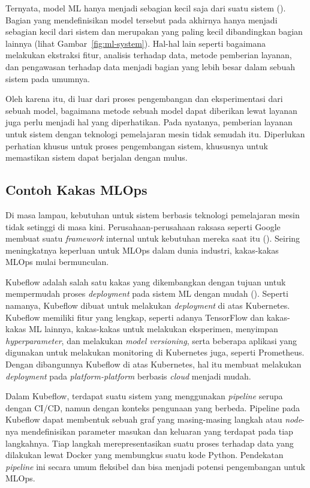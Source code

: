 Ternyata, model ML hanya menjadi sebagian kecil saja dari suatu sistem (\cite{NIPS2015_86df7dcf}).
Bagian yang mendefinisikan model tersebut pada akhirnya hanya menjadi sebagian kecil dari sistem dan merupakan yang paling kecil dibandingkan bagian lainnya (lihat Gambar~\ref{fig:ml-system}).
Hal-hal lain seperti bagaimana melakukan ekstraksi fitur, analisis terhadap data, metode pemberian layanan, dan pengawasan terhadap data menjadi bagian yang lebih besar dalam sebuah sistem pada umumnya.

Oleh karena itu, di luar dari proses pengembangan dan eksperimentasi dari sebuah model, bagaimana metode sebuah model dapat diberikan lewat layanan juga perlu menjadi hal yang diperhatikan.
Pada nyatanya, pemberian layanan untuk sistem dengan teknologi pemelajaran mesin tidak semudah itu.
Diperlukan perhatian khusus untuk proses pengembangan sistem, khususnya untuk memastikan sistem dapat berjalan dengan mulus.

\subsection{Contoh Kakas MLOps}

Di masa lampau, kebutuhan untuk sistem berbasis teknologi pemelajaran mesin tidak setinggi di masa kini. 
Perusahaan-perusahaan raksasa seperti Google membuat suatu \textit{framework} internal untuk kebutuhan mereka saat itu (\cite{mlops}).
Seiring meningkatnya keperluan untuk MLOps dalam dunia industri, kakas-kakas MLOps mulai bermunculan.

Kubeflow adalah salah satu kakas yang dikembangkan dengan tujuan untuk mempermudah proses \textit{deployment} pada sistem ML dengan mudah (\cite{k8s}).
Seperti namanya, Kubeflow dibuat untuk melakukan \textit{deployment} di atas Kubernetes.
Kubeflow memiliki fitur yang lengkap, seperti adanya TensorFlow dan kakas-kakas ML lainnya, kakas-kakas untuk melakukan eksperimen, menyimpan \textit{hyperparameter}, dan melakukan \textit{model versioning}, serta beberapa aplikasi yang digunakan untuk melakukan monitoring di Kubernetes juga, seperti Prometheus.
Dengan dibangunnya Kubeflow di atas Kubernetes, hal itu membuat melakukan \textit{deployment} pada \textit{platform-platform} berbasis \textit{cloud} menjadi mudah.

Dalam Kubeflow, terdapat suatu sistem yang menggunakan \textit{pipeline} serupa dengan CI/CD, namun dengan konteks pengunaan yang berbeda.
Pipeline pada Kubeflow dapat membentuk sebuah graf yang masing-masing langkah atau \textit{node}-nya mendefinisikan parameter masukan dan keluaran yang terdapat pada tiap langkahnya.
Tiap langkah merepresentasikan suatu proses terhadap data yang dilakukan lewat Docker yang membungkus suatu kode Python.
Pendekatan \textit{pipeline} ini secara umum fleksibel dan bisa menjadi potensi pengembangan untuk MLOps.

